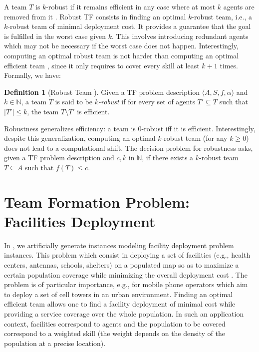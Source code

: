 \documentclass[conference]{IEEEtran}
\theoremstyle{definition}
\newtheorem{definition}{Definition}
\begin{document}
A team $T$ is $k$-robust if it remains efficient in any
case where at most $k$ agents are removed from it \cite{Okimoto2015}.
Robust TF consists in finding an optimal $k$-robust team, i.e., a
$k$-robust team of minimal deployment cost. It provides a
guarantee that the goal is fulfilled in the worst case given $k$.
This involves introducing redundant agents which may not be necessary if the worst case does not happen.
Interestingly, computing an optimal robust team is not harder than computing an optimal 
efficient team \cite{Okimoto2015}, since it only requires to cover every skill at least $k + 1$ times.
Formally, we have:

\begin{definition}[Robust Team \cite{Okimoto2015}]
	Given a TF problem description $\langle A, S, f, \alpha\rangle$ and  $k \in \mathbb{N}$, a team $T$
	is said to be \emph{$k$-robust} if for every set of agents $T' \subseteq T$ such that $|T'| \leq k$, the team $T \setminus T'$ is efficient.
	\label{def:TFrobust}
\end{definition}

Robustness generalizes efficiency: a team is $0$-robust iff it is efficient.
Interestingly, despite this generalization, computing an optimal $k$-robust team (for any $k \geq 0$) does not lead to a computational shift.
The decision problem for robustness asks, given a TF problem description and $c, k$ in $\mathbb{N}$,
if there exists a $k$-robust team $T \subseteq A$ such that $f(T) \leq c$. 


\section{Team Formation Problem: Facilities Deployment}

In \cite{schwind2021}, we artificially generate instances modeling facility deployment problem instances.
This problem which consist in deploying a set of facilities 
(e.g., health centers, antennas, schools, shelters) on a populated map
so as to maximize a certain population coverage while minimizing the overall deployment cost \cite{fac}.
The problem is of particular importance, e.g., for mobile phone operators 
which aim to deploy a set of cell towers in an urban environment.
Finding an optimal efficient team allows one to find a facility deployment 
of minimal cost while providing a service coverage over
the whole population. In such an application context, facilities correspond to agents 
and the population to be covered correspond to a weighted skill
(the weight depends on the density of the population at a precise location).
\end{document}
